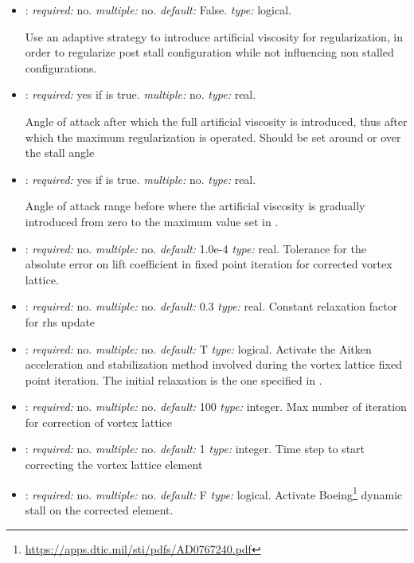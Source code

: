 \begin{itemize}
\item {}: \textit{required:} no. 
\textit{multiple:} no. \textit{default:} False. \textit{type:} logical.

Use an adaptive strategy to introduce artificial viscosity for regularization, 
in order to regularize post stall configuration while not influencing non 
stalled configurations. 

\item {}: \textit{required:} yes if 
 is true. \textit{multiple:} no. \textit{type:} real.

Angle of attack after which the full artificial viscosity is introduced, 
thus after which the maximum regularization is operated. Should be set 
around or over the stall angle

\item {}: \textit{required:} 
yes if  is true. \textit{multiple:} no. 
\textit{type:} real.

Angle of attack range before  
where the artificial viscosity is gradually introduced from zero to the maximum 
value set in .

\item {}: \textit{required:} no. \textit{multiple:} no. 
\textit{default:} 1.0e-4 \textit{type:} real. 
Tolerance for the absolute error on lift coefficient in fixed point 
iteration for corrected vortex lattice.

\item {}: \textit{required:} no. \textit{multiple:} no. 
\textit{default:} 0.3 \textit{type:} real. 
Constant relaxation factor for rhs update

\item {}: \textit{required:} no. \textit{multiple:} no. 
\textit{default:} T \textit{type:} logical. 
Activate the Aitken acceleration and stabilization method involved during the 
vortex lattice fixed point iteration. 
The initial relaxation is the one specified in . 

\item {}: \textit{required:} no. \textit{multiple:} no. 
\textit{default:} 100 \textit{type:} integer. 
Max number of iteration for correction of vortex lattice

\item {}: \textit{required:} no. \textit{multiple:} no. 
\textit{default:} 1 \textit{type:} integer. 
Time step to start correcting the vortex lattice element

\item {}: \textit{required:} no. \textit{multiple:} no. \textit{default:} F \textit{type:} logical. 
Activate Boeing\footnote{\url{https://apps.dtic.mil/sti/pdfs/AD0767240.pdf}} 
dynamic stall on the corrected  element.  


\end{itemize}

